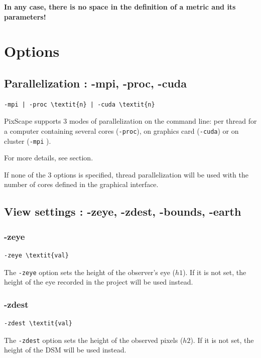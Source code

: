 \documentclass{report}
\begin{document}
\textbf{In any case, there is no space in the definition of a metric and its parameters!}

\section{Options}

\subsection{Parallelization : -mpi, -proc, -cuda}
\begin{Verbatim}[commandchars=\\\{\}]
-mpi | -proc \textit{n} | -cuda \textit{n}
\end{Verbatim}

PixScape supports 3 modes of parallelization on the command line: per thread for a computer containing several cores (\verb|-proc|), on graphics card (\verb|-cuda|) or on cluster (\verb|-mpi| ).

For more details, see  section.

If none of the 3 options is specified, thread parallelization will be used with the number of cores defined in the graphical interface.

\subsection{View settings : -zeye, -zdest, -bounds, -earth}

\subsubsection{-zeye}
\begin{Verbatim}[commandchars=\\\{\}]
-zeye \textit{val}
\end{Verbatim}
The \verb|-zeye| option sets the height of the observer's eye ($h1$). If it is not set, the height of the eye recorded in the project will be used instead.

\subsubsection{-zdest}
\begin{Verbatim}[commandchars=\\\{\}]
-zdest \textit{val}
\end{Verbatim}
The \verb|-zdest| option sets the height of the observed pixels ($h2$). If it is not set, the height of the DSM will be used instead.
\end{document}
